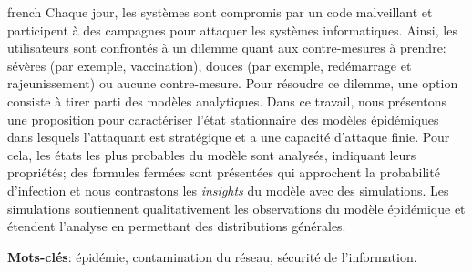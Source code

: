 
\begin{resumo}[Résumé]
 \begin{otherlanguage*}{french}
    Chaque jour, les systèmes sont compromis par un code malveillant et participent à des campagnes pour attaquer les systèmes informatiques.
    Ainsi, les utilisateurs sont confrontés à un dilemme quant aux contre-mesures à prendre: sévères (par exemple, vaccination), douces (par exemple, redémarrage et rajeunissement) ou aucune contre-mesure. Pour résoudre ce dilemme, une option consiste à tirer parti des modèles analytiques. Dans ce travail, nous présentons une proposition pour caractériser l'état stationnaire des modèles épidémiques dans lesquels l'attaquant est stratégique et a une capacité d'attaque finie. Pour cela, les états les plus probables du modèle sont analysés, indiquant leurs propriétés; des formules fermées sont présentées qui approchent la probabilité d'infection et nous contrastons les \emph{insights} du modèle avec des simulations. Les simulations soutiennent qualitativement les observations du modèle épidémique et étendent l'analyse en permettant des distributions générales.
 
   \textbf{Mots-clés}: épidémie, contamination du réseau, sécurité de l'information.
 \end{otherlanguage*}
\end{resumo}